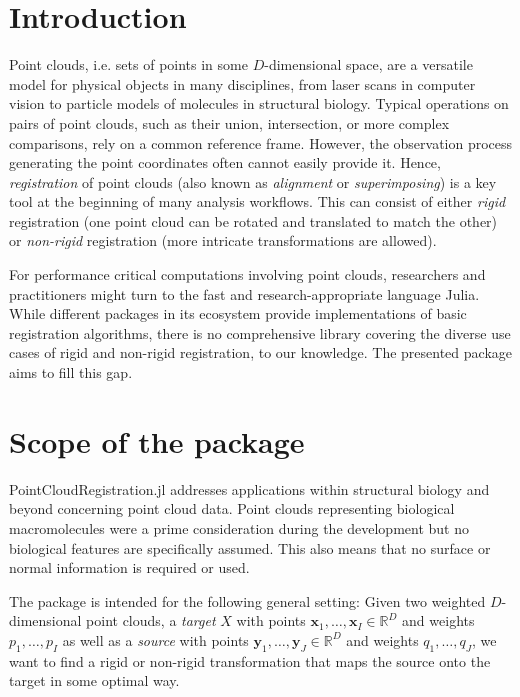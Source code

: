 \section{Introduction}

Point clouds, i.e. sets of points in some \(D\)-dimensional space, are a
versatile model for physical objects in many disciplines, from laser
scans in computer vision to particle models of molecules in structural
biology. Typical operations on pairs of point clouds, such as their
union, intersection, or more complex comparisons, rely on a common
reference frame. However, the observation process generating the point
coordinates often cannot easily provide it. Hence, \emph{registration}
of point clouds (also known as \emph{alignment} or \emph{superimposing})
is a key tool at the beginning of many analysis workflows. This can
consist of either \emph{rigid} registration (one point cloud can be
rotated and translated to match the other) or \emph{non-rigid}
registration (more intricate transformations are allowed).

For performance critical computations involving point clouds,
researchers and practitioners might turn to the fast and
research-appropriate language Julia. While different packages in its
ecosystem provide implementations of basic registration algorithms,
there is no comprehensive library covering the diverse use cases of
rigid and non-rigid registration, to our knowledge. The presented
package aims to fill this gap.

\section{Scope of the package}

PointCloudRegistration.jl addresses applications within structural
biology and beyond concerning point cloud data. Point clouds
representing biological macromolecules were a prime consideration during
the development but no biological features are specifically assumed.
This also means that no surface or normal information is required or
used.

The package is intended for the following general setting: Given two
weighted \(D\)-dimensional point clouds, a \emph{target} \(X\) with
points \({\bm{x}}_{1},\ldots,{\bm{x}}_{I} \in {\mathbb{R}}^{D}\)
and weights \(p_{1},\ldots,p_{I}\) as well as a \emph{source} with
points \({\bm{y}}_{1},\ldots,{\bm{y}}_{J} \in {\mathbb{R}}^{D}\)
and weights \(q_{1},\ldots,q_{J}\), we want to find a rigid or non-rigid
transformation that maps the source onto the target in some optimal way.

